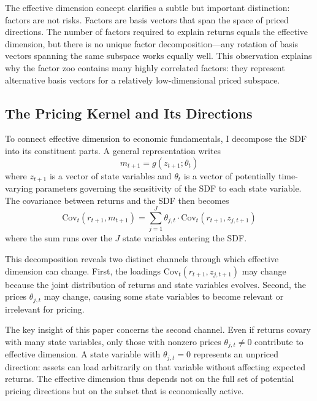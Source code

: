 \documentclass[12pt,letterpaper]{article}
\theoremstyle{plain}
\theoremstyle{definition}
\newcommand{\Cov}{\mathrm{Cov}}
\newcommand{\SDF}{m}
\begin{document}
The effective dimension concept clarifies a subtle but important distinction: factors are not risks. Factors are basis vectors that span the space of priced directions. The number of factors required to explain returns equals the effective dimension, but there is no unique factor decomposition---any rotation of basis vectors spanning the same subspace works equally well. This observation explains why the factor zoo contains many highly correlated factors: they represent alternative basis vectors for a relatively low-dimensional priced subspace.

\subsection{The Pricing Kernel and Its Directions}\label{subsec:kernel}

To connect effective dimension to economic fundamentals, I decompose the SDF into its constituent parts. A general representation writes
\begin{equation}\label{eq:sdf_decomposition}
\SDF_{t+1} = g(z_{t+1}; \theta_t)
\end{equation}
where $z_{t+1}$ is a vector of state variables and $\theta_t$ is a vector of potentially time-varying parameters governing the sensitivity of the SDF to each state variable. The covariance between returns and the SDF then becomes
\begin{equation}\label{eq:cov_decomposition}
\Cov_t(r_{t+1}, \SDF_{t+1}) = \sum_{j=1}^{J} \theta_{j,t} \cdot \Cov_t(r_{t+1}, z_{j,t+1})
\end{equation}
where the sum runs over the $J$ state variables entering the SDF.

This decomposition reveals two distinct channels through which effective dimension can change. First, the loadings $\Cov_t(r_{t+1}, z_{j,t+1})$ may change because the joint distribution of returns and state variables evolves. Second, the prices $\theta_{j,t}$ may change, causing some state variables to become relevant or irrelevant for pricing.

The key insight of this paper concerns the second channel. Even if returns covary with many state variables, only those with nonzero prices $\theta_{j,t} \neq 0$ contribute to effective dimension. A state variable with $\theta_{j,t} = 0$ represents an unpriced direction: assets can load arbitrarily on that variable without affecting expected returns. The effective dimension thus depends not on the full set of potential pricing directions but on the subset that is economically active.
\end{document}

